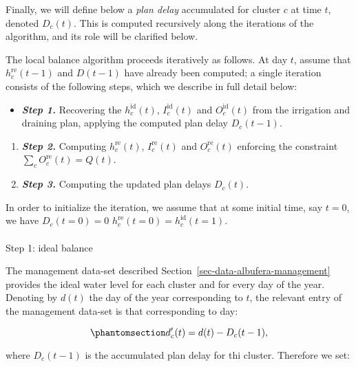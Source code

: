 \documentclass[
  letterpaper,
  DIV=11,
  numbers=noendperiod]{scrreprt}
\makeatletter
\let\oldparagraph\paragraph
\renewcommand{\paragraph}{
    \@ifstar
      \xxxParagraphStar
      \xxxParagraphNoStar
  }
\newcommand{\xxxParagraphStar}[1]{\oldparagraph*{#1}\mbox{}}
\newcommand{\xxxParagraphNoStar}[1]{\oldparagraph{#1}\mbox{}}
\providecommand{\tightlist}{%
  \setlength{\itemsep}{0pt}\setlength{\parskip}{0pt}}\usepackage{longtable,booktabs,array}
\makeatother
\begin{document}
Finally, we will define below a \emph{plan delay} accumulated for
cluster \(c\) at time \(t\), denoted \(D_c(t)\). This is computed
recursively along the iterations of the algorithm, and its role will be
clarified below.

The local balance algorithm proceeds iteratively as follows. At day
\(t\), assume that \(h_c ^\text{re}(t-1)\) and \(D(t-1)\) have already
been computed; a single iteration consists of the following steps, which
we describe in full detail below:

\begin{itemize}
\tightlist
\item
  \textbf{\emph{Step 1.}} Recovering the \(h_c ^\text{id}(t)\),
  \(I_c ^\text{id}(t)\) and \(O_c ^\text{id}(t)\) from the irrigation
  and draining plan, applying the computed plan delay \(D_c(t-1)\).
\end{itemize}

\begin{enumerate}
\def\labelenumi{\arabic{enumi}.}
\setcounter{enumi}{1}
\item
  \textbf{\emph{Step 2.}} Computing \(h_c ^\text{re}(t)\),
  \(I_c ^\text{re}(t)\) and \(O_c ^\text{re}(t)\) enforcing the
  constraint \(\sum _c O_c ^\text{re}(t) = Q(t)\).
\item
  \textbf{\emph{Step 3.}} Computing the updated plan delays \(D_c(t)\).
\end{enumerate}

In order to initialize the iteration, we assume that at some initial
time, say \(t = 0\), we have \(D_c(t=0) = 0\)
\(h_c ^\text{re}(t=0) = h_c ^\text{id}(t=1)\).

\paragraph{Step 1: ideal balance}\label{step-1-ideal-balance}

The management data-set described
Section~\ref{sec-data-albufera-management} provides the ideal water
level for each cluster and for every day of the year. Denoting by
\(d(t)\) the day of the year corresponding to \(t\), the relevant entry
of the management data-set is that corresponding to day:

\begin{equation}\phantomsection\label{eq-hbl-yday-shifted}{
d^\prime_c(t) = d(t) - D_c(t-1),
}\end{equation}

where \(D_c(t-1)\) is the accumulated plan delay for thi cluster.
Therefore we set:
\end{document}
